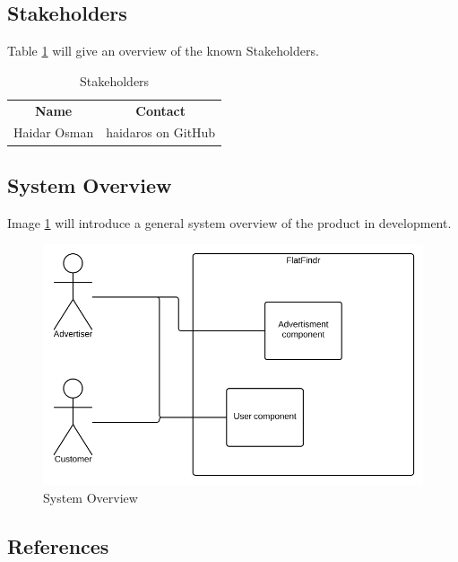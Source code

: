 \subsection{Stakeholders}
Table \ref{table-stakeholders} will give an overview of the known
Stakeholders.
\begin{table}[H]
	\centering
	\begin{tabular}{ll}
	\multicolumn{1}{c}{\textbf{Name}} & \multicolumn{1}{c}{\textbf{Contact}} \\
	Haidar Osman & haidaros on GitHub                                        
	\end{tabular}
	\caption{Stakeholders}
	\label{table-stakeholders}
\end{table}

\subsection{System Overview}
Image \ref{image-system-overview} will introduce a general system overview
of the product in development.
\begin{figure}[p]
    \centering
	\includegraphics[width=12cm]{images/system-overview}
	\caption{System Overview}
    \label{image-system-overview}
\end{figure}

\subsection{References}
